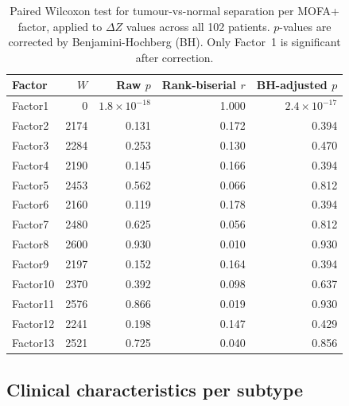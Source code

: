 \begin{table}[htbp]
    \centering
    \caption{Paired Wilcoxon test for tumour-vs-normal separation per MOFA+ factor,
    applied to $\Delta Z$ values across all 102 patients. $p$-values are corrected
    by Benjamini-Hochberg (BH). Only Factor~1 is significant after correction.}
    \label{tab:app_tissue_stats}
    \begin{tabular}{lrrrr}
        \toprule
        Factor & $W$ & Raw $p$ & Rank-biserial $r$ & BH-adjusted $p$ \\
        \midrule
        Factor1  &     0 & $1.8 \times 10^{-18}$ & 1.000 & $2.4 \times 10^{-17}$ \\
        Factor2  &  2174 & 0.131                 & 0.172 & 0.394 \\
        Factor3  &  2284 & 0.253                 & 0.130 & 0.470 \\
        Factor4  &  2190 & 0.145                 & 0.166 & 0.394 \\
        Factor5  &  2453 & 0.562                 & 0.066 & 0.812 \\
        Factor6  &  2160 & 0.119                 & 0.178 & 0.394 \\
        Factor7  &  2480 & 0.625                 & 0.056 & 0.812 \\
        Factor8  &  2600 & 0.930                 & 0.010 & 0.930 \\
        Factor9  &  2197 & 0.152                 & 0.164 & 0.394 \\
        Factor10 &  2370 & 0.392                 & 0.098 & 0.637 \\
        Factor11 &  2576 & 0.866                 & 0.019 & 0.930 \\
        Factor12 &  2241 & 0.198                 & 0.147 & 0.429 \\
        Factor13 &  2521 & 0.725                 & 0.040 & 0.856 \\
        \bottomrule
    \end{tabular}
\end{table}

\subsection{Clinical characteristics per subtype}

